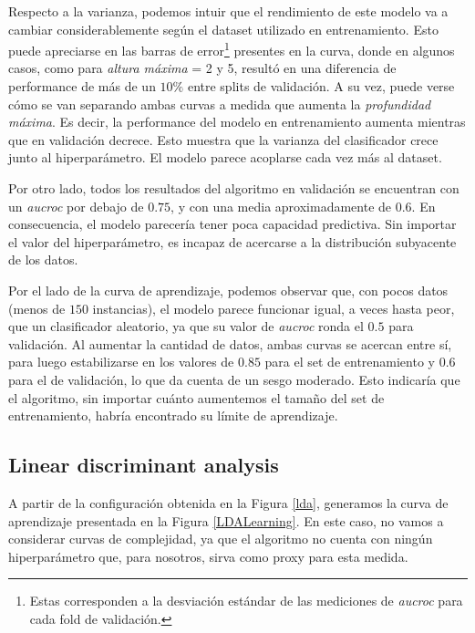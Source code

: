 Respecto a la varianza, podemos intuir que el rendimiento de este modelo va a cambiar considerablemente según el dataset utilizado en entrenamiento. Esto puede apreciarse en las barras de error\footnote{Estas corresponden a la desviación estándar de las mediciones de \textit{aucroc} para cada fold de validación.} presentes en la curva, donde en algunos casos, como para \textit{altura máxima} = 2 y 5, resultó en una diferencia de performance de más de un $10\%$ entre splits de validación. A su vez, puede verse cómo se van separando ambas curvas a medida que aumenta la \textit{profundidad máxima}. Es decir, la performance del modelo en entrenamiento aumenta mientras que en validación decrece. Esto muestra que la varianza del clasificador crece junto al hiperparámetro. El modelo parece acoplarse cada vez más al dataset.

Por otro lado, todos los resultados del algoritmo en validación se encuentran con un \textit{aucroc} por debajo de $0.75$, y con una media aproximadamente de $0.6$. En consecuencia, el modelo parecería tener poca capacidad predictiva. Sin importar el valor del hiperparámetro, es incapaz de acercarse a la distribución subyacente de los datos.


Por el lado de la curva de aprendizaje, podemos observar que, con pocos datos (menos de $150$ instancias), el modelo parece funcionar igual, a veces hasta peor, que un clasificador aleatorio, ya que su valor de \textit{aucroc} ronda el $0.5$ para validación. Al aumentar la cantidad de datos, ambas curvas se acercan entre sí, para luego estabilizarse en los valores de $0.85$ para el set de entrenamiento y $0.6$ para el de validación, lo que da cuenta de un sesgo moderado. Esto indicaría que el algoritmo, sin importar cuánto aumentemos el tamaño del set de entrenamiento, habría encontrado su límite de aprendizaje. 

\subsection{Linear discriminant analysis}
A partir de la configuración obtenida en la Figura \ref{lda}, generamos la curva de aprendizaje presentada en la Figura \ref{LDALearning}. En este caso, no vamos a considerar curvas de complejidad, ya que el algoritmo no cuenta con ningún hiperparámetro que, para nosotros, sirva como proxy para esta medida.

